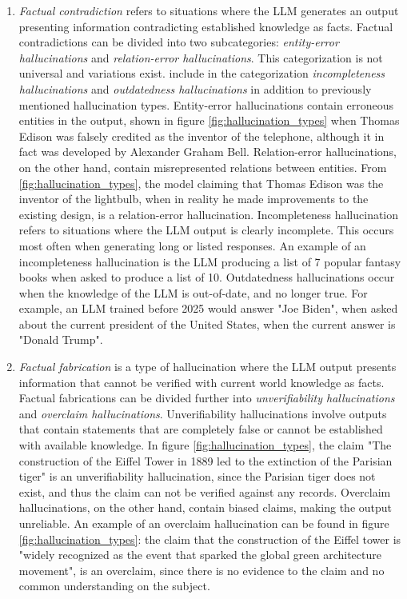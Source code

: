 \documentclass[english, 12pt, a4paper, sci, utf8, a-2b, online]{../definitions/aaltothesis}
\begin{document}
\begin{enumerate}
    \item \textit{Factual contradiction} refers to situations where the LLM generates an output presenting information contradicting established knowledge as facts. Factual contradictions can be divided into two subcategories: \textit{entity-error hallucinations} and \textit{relation-error hallucinations}. This categorization is not universal and variations exist. \textcite{li2024dawndarkempiricalstudy} include in the categorization \textit{incompleteness hallucinations} and \textit{outdatedness hallucinations} in addition to previously mentioned hallucination types. Entity-error hallucinations contain erroneous entities in the output, shown in figure \ref{fig:hallucination_types} when Thomas Edison was falsely credited as the inventor of the telephone, although it in fact was developed by Alexander Graham Bell. Relation-error hallucinations, on the other hand, contain misrepresented relations between entities. From \ref{fig:hallucination_types}, the model claiming that Thomas Edison was the inventor of the lightbulb, when in reality he made improvements to the existing design, is a relation-error hallucination. Incompleteness hallucination refers to situations where the LLM output is clearly incomplete. This occurs most often when generating long or listed responses. An example of an incompleteness hallucination is the LLM producing a list of 7 popular fantasy books when asked to produce a list of 10. Outdatedness hallucinations occur when the knowledge of the LLM is out-of-date, and no longer true. For example, an LLM trained before 2025 would answer "Joe Biden", when asked about the current president of the United States, when the current answer is "Donald Trump".
    
    \item \textit{Factual fabrication} is a type of hallucination where the LLM output presents information that cannot be verified with current world knowledge as facts. Factual fabrications can be divided further into \textit{unverifiability hallucinations} and \textit{overclaim hallucinations}. Unverifiability hallucinations involve outputs that contain statements that are completely false or cannot be established with available knowledge. In figure \ref{fig:hallucination_types}, the claim "The construction of the Eiffel Tower in 1889 led to the extinction of the Parisian tiger" is an unverifiability hallucination, since the Parisian tiger does not exist, and thus the claim can not be verified against any records. Overclaim hallucinations, on the other hand, contain biased claims, making the output unreliable. An example of an overclaim hallucination can be found in figure \ref{fig:hallucination_types}: the claim that the construction of the Eiffel tower is  "widely recognized as the event that sparked the global green architecture movement", is an overclaim, since there is no evidence to the claim and no common understanding on the subject.

\end{enumerate}
\end{document}
